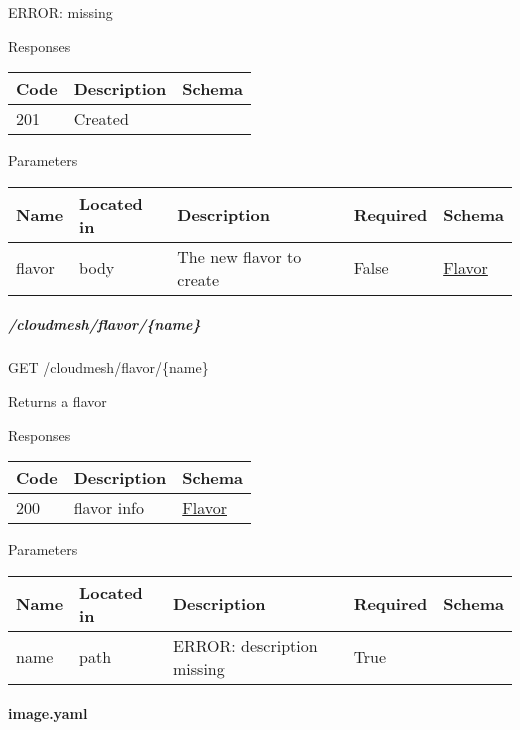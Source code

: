 \documentclass[9pt,]{article}
\let\oldparagraph\paragraph
\renewcommand{\paragraph}[1]{\oldparagraph{#1}\mbox{}}
\let\oldsubparagraph\subparagraph
\renewcommand{\subparagraph}[1]{\oldsubparagraph{#1}\mbox{}}
\begin{document}
ERROR: missing

Responses

\begin{longtable}[]{@{}lll@{}}
\toprule
Code & Description & Schema\tabularnewline
\midrule
\endhead
201 & Created &\tabularnewline
\bottomrule
\end{longtable}

Parameters

\begin{longtable}[]{@{}lllll@{}}
\toprule
Name & Located in & Description & Required & Schema\tabularnewline
\midrule
\endhead
flavor & body & The new flavor to create & False &
\protect\hyperlink{flavor}{Flavor}\tabularnewline
\bottomrule
\end{longtable}

\hypertarget{cloudmeshflavorname}{%
\subparagraph{/cloudmesh/flavor/\{name\}}\label{cloudmeshflavorname}}

GET /cloudmesh/flavor/\{name\}

Returns a flavor

Responses

\begin{longtable}[]{@{}lll@{}}
\toprule
Code & Description & Schema\tabularnewline
\midrule
\endhead
200 & flavor info & \protect\hyperlink{flavor}{Flavor}\tabularnewline
\bottomrule
\end{longtable}

Parameters

\begin{longtable}[]{@{}lllll@{}}
\toprule
Name & Located in & Description & Required & Schema\tabularnewline
\midrule
\endhead
name & path & ERROR: description missing & True &\tabularnewline
\bottomrule
\end{longtable}

\hypertarget{image.yaml-1}{%
\paragraph{image.yaml}\label{image.yaml-1}}
\end{document}

